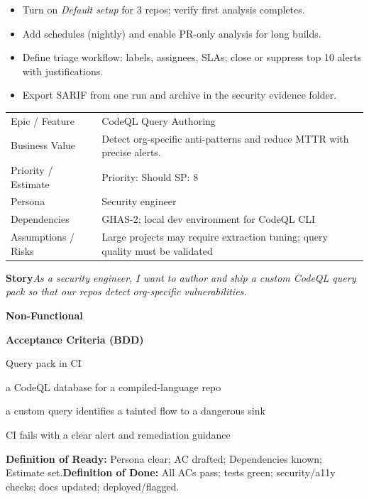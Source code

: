 \documentclass[11pt,a4paper]{article}
\newcommand{\cb}{\(\square\)}
\newenvironment{GHASCard}[2]{%
  \begin{tcolorbox}[ghascard,title={\ghasheader{#1 --- #2}}]
  \small
}{%
  \end{tcolorbox}
}
\newenvironment{GHASTasks}{%
  \begin{tcolorbox}[ghastasks]
  \small
  \begin{itemize}[label=\cb, leftmargin=*, labelsep=0.6em]
}{%
  \end{itemize}
  \end{tcolorbox}
}
\newcommand{\DoR}{\textbf{Definition of Ready:} Persona clear; AC drafted; Dependencies known; Estimate set.}
\newcommand{\DoD}{\textbf{Definition of Done:} All ACs pass; tests green; security/a11y checks; docs updated; deployed/flagged.}
\begin{document}
\begin{GHASTasks}
\item Turn on \emph{Default setup} for 3 repos; verify first analysis completes.
\item Add schedules (nightly) and enable PR-only analysis for long builds.
\item Define triage workflow: labels, assignees, SLAs; close or suppress top 10 alerts with justifications.
\item Export SARIF from one run and archive in the security evidence folder.
\end{GHASTasks}
\clearpage

\begin{GHASCard}{GHAS-3}{CodeQL Deep Dive: CLI, Databases, Custom Queries}
\begin{tabularx}{\linewidth}{L V}
Epic / Feature & CodeQL Query Authoring \tabularnewline
Business Value & Detect org-specific anti-patterns and reduce MTTR with precise alerts. \tabularnewline
Priority / Estimate & Priority: Should \quad SP: 8 \tabularnewline
Persona & Security engineer \tabularnewline
Dependencies & GHAS-2; local dev environment for CodeQL CLI \tabularnewline
Assumptions / Risks & Large projects may require extraction tuning; query quality must be validated \tabularnewline
\end{tabularx}

\medskip
\textbf{Story}\quad \emph{As a security engineer, I want to author and ship a custom CodeQL query pack so that our repos detect org-specific vulnerabilities.}

\medskip
\textbf{Non-Functional}\quad
{}\ \ 

\medskip
\textbf{Acceptance Criteria (BDD)}
\begin{description}[leftmargin=2.7cm, labelwidth=2.6cm, style=nextline]
  \item[\textbf{Scenario}] Query pack in CI
  \item[\textbf{Given}] a CodeQL database for a compiled-language repo
  \item[\textbf{When}] a custom query identifies a tainted flow to a dangerous sink
  \item[\textbf{Then}] CI fails with a clear alert and remediation guidance
\end{description}

\medskip
\DoR\quad\textbullet\quad\DoD
\end{GHASCard}
\end{document}
